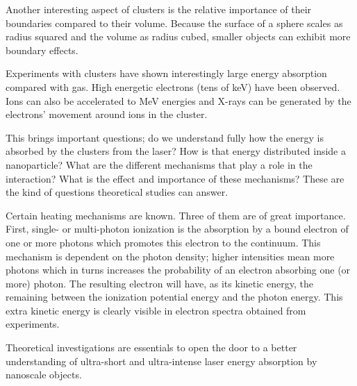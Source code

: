 Another interesting aspect of clusters is the relative importance of 
their boundaries compared to their volume. Because the surface of a sphere 
scales as radius squared and the volume as radius cubed, smaller objects can 
exhibit more boundary effects.

Experiments with clusters have shown interestingly large energy absorption 
compared with gas. High energetic electrons (tens of keV) have been observed. 
Ions can also be accelerated to MeV energies and X-rays can be generated by the 
electrons' movement around ions in the cluster.

This brings important questions; do we understand fully how the energy is 
absorbed by the clusters from the laser? How is that energy distributed 
inside a nanoparticle? What are the different mechanisms that play a role in 
the interaction? What is the effect and importance of these mechanisms? These 
are the kind of questions theoretical studies can answer.

Certain heating mechanisms are known. Three of them are of great importance. 
First, single- or multi-photon ionization is the absorption by a bound electron 
of one or more photons which promotes this electron to the continuum. This 
mechanism is dependent on the photon density; higher intensities mean more 
photons which in turns increases the probability of an electron absorbing one 
(or more) photon. The resulting electron will have, as its kinetic energy, the 
remaining between the ionization potential energy and the photon energy. This 
extra kinetic energy is clearly visible in electron spectra obtained from 
experiments.



Theoretical investigations are essentials to open the door to a better 
understanding of ultra-short and ultra-intense laser energy absorption by 
nanoscale objects.




